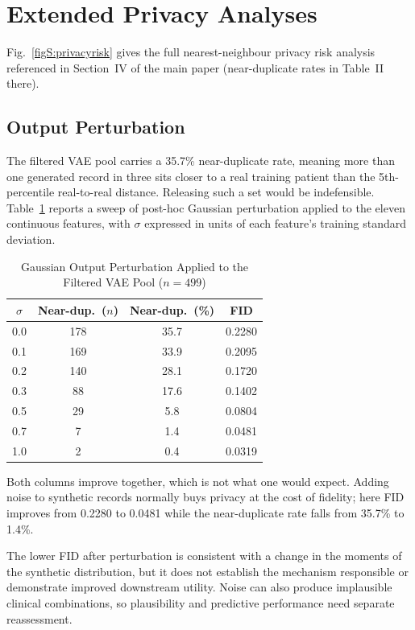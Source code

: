 \documentclass[journal,onecolumn]{IEEEtran}
\begin{document}
\section{Extended Privacy Analyses}

Fig.~\ref{figS:privacyrisk} gives the full nearest-neighbour privacy risk analysis referenced in Section~IV of the main paper (near-duplicate rates in Table~II there).

\subsection{Output Perturbation}

The filtered VAE pool carries a 35.7\% near-duplicate rate, meaning more than one generated record in three sits closer to a real training patient than the 5th-percentile real-to-real distance. Releasing such a set would be indefensible. Table~\ref{tab:perturb} reports a sweep of post-hoc Gaussian perturbation applied to the eleven continuous features, with $\sigma$ expressed in units of each feature's training standard deviation.

\begin{table}[!t]
  \centering
  \caption{Gaussian Output Perturbation Applied to the Filtered VAE Pool ($n = 499$)}
  \label{tab:perturb}
  \begin{tabular}{cccc}
    \toprule
    $\sigma$ & Near-dup.\ ($n$) & Near-dup.\ (\%) & FID \\
    \midrule
    0.0 & 178 & 35.7 & 0.2280 \\
    0.1 & 169 & 33.9 & 0.2095 \\
    0.2 & 140 & 28.1 & 0.1720 \\
    0.3 & 88 & 17.6 & 0.1402 \\
    0.5 & 29 & 5.8 & 0.0804 \\
    0.7 & 7 & 1.4 & 0.0481 \\
    1.0 & 2 & 0.4 & 0.0319 \\
    \bottomrule
  \end{tabular}
\end{table}

Both columns improve together, which is not what one would expect. Adding noise to synthetic records normally buys privacy at the cost of fidelity; here FID improves from 0.2280 to 0.0481 while the near-duplicate rate falls from 35.7\% to 1.4\%.

The lower FID after perturbation is consistent with a change in the moments of the synthetic distribution, but it does not establish the mechanism responsible or demonstrate improved downstream utility. Noise can also produce implausible clinical combinations, so plausibility and predictive performance need separate reassessment.
\end{document}

